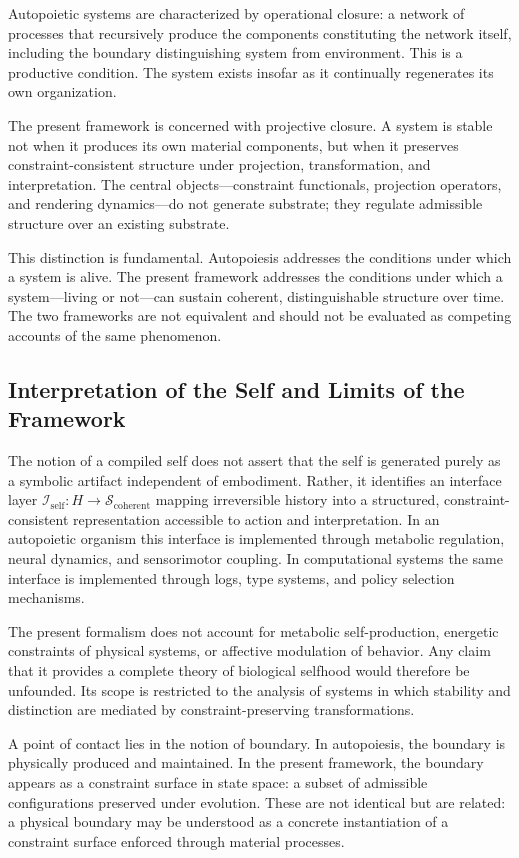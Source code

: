 \documentclass[12pt, a4paper]{article}
\theoremstyle{plain}
\theoremstyle{definition}
\theoremstyle{remark}
\begin{document}
Autopoietic systems are characterized by operational closure: a network of processes that recursively produce the components constituting the network itself, including the boundary distinguishing system from environment. This is a productive condition. The system exists insofar as it continually regenerates its own organization.

The present framework is concerned with projective closure. A system is stable not when it produces its own material components, but when it preserves constraint-consistent structure under projection, transformation, and interpretation. The central objects---constraint functionals, projection operators, and rendering dynamics---do not generate substrate; they regulate admissible structure over an existing substrate.

This distinction is fundamental. Autopoiesis addresses the conditions under which a system is alive. The present framework addresses the conditions under which a system---living or not---can sustain coherent, distinguishable structure over time. The two frameworks are not equivalent and should not be evaluated as competing accounts of the same phenomenon.

\subsection{Interpretation of the Self and Limits of the Framework}

The notion of a compiled self does not assert that the self is generated purely as a symbolic artifact independent of embodiment. Rather, it identifies an interface layer $\mathcal{I}_{\mathrm{self}} : H \to \mathcal{S}_{\mathrm{coherent}}$ mapping irreversible history into a structured, constraint-consistent representation accessible to action and interpretation. In an autopoietic organism this interface is implemented through metabolic regulation, neural dynamics, and sensorimotor coupling. In computational systems the same interface is implemented through logs, type systems, and policy selection mechanisms.

The present formalism does not account for metabolic self-production, energetic constraints of physical systems, or affective modulation of behavior. Any claim that it provides a complete theory of biological selfhood would therefore be unfounded. Its scope is restricted to the analysis of systems in which stability and distinction are mediated by constraint-preserving transformations.

A point of contact lies in the notion of boundary. In autopoiesis, the boundary is physically produced and maintained. In the present framework, the boundary appears as a constraint surface in state space: a subset of admissible configurations preserved under evolution. These are not identical but are related: a physical boundary may be understood as a concrete instantiation of a constraint surface enforced through material processes.
\end{document}
